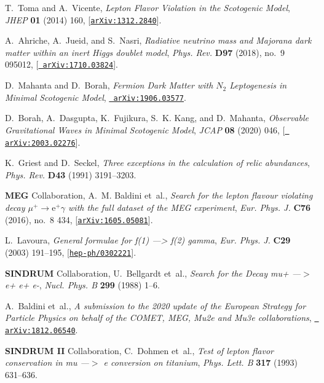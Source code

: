 \documentclass[prd,nofootinbib,preprint,superscriptaddress]{revtex4}
\begin{document}
\begin{thebibliography}{100}
T.~Toma and A.~Vicente, {\it {Lepton Flavor Violation in the Scotogenic
  Model}},  {\em JHEP} {\bf 01} (2014) 160,
  [\href{http://arxiv.org/abs/1312.2840}{{\tt arXiv:1312.2840}}].

A.~Ahriche, A.~Jueid, and S.~Nasri, {\it {Radiative neutrino mass and Majorana
  dark matter within an inert Higgs doublet model}},  {\em Phys. Rev.} {\bf
  D97} (2018), no.~9 095012, [\href{http://arxiv.org/abs/1710.03824}{{\tt
  arXiv:1710.03824}}].

D.~Mahanta and D.~Borah, {\it {Fermion Dark Matter with $N_2$ Leptogenesis in
  Minimal Scotogenic Model}},  \href{http://arxiv.org/abs/1906.03577}{{\tt
  arXiv:1906.03577}}.

D.~Borah, A.~Dasgupta, K.~Fujikura, S.~K. Kang, and D.~Mahanta, {\it
  {Observable Gravitational Waves in Minimal Scotogenic Model}},  {\em JCAP}
  {\bf 08} (2020) 046, [\href{http://arxiv.org/abs/2003.02276}{{\tt
  arXiv:2003.02276}}].

K.~Griest and D.~Seckel, {\it {Three exceptions in the calculation of relic
  abundances}},  {\em Phys. Rev.} {\bf D43} (1991) 3191--3203.

{\bf MEG} Collaboration, A.~M. Baldini et~al., {\it {Search for the lepton
  flavour violating decay $\mu ^+ \rightarrow \mathrm {e}^+ \gamma $ with the
  full dataset of the MEG experiment}},  {\em Eur. Phys. J.} {\bf C76} (2016),
  no.~8 434, [\href{http://arxiv.org/abs/1605.05081}{{\tt arXiv:1605.05081}}].

L.~Lavoura, {\it {General formulae for f(1) ---> f(2) gamma}},  {\em Eur. Phys.
  J.} {\bf C29} (2003) 191--195,
  [\href{http://arxiv.org/abs/hep-ph/0302221}{{\tt hep-ph/0302221}}].

{\bf SINDRUM} Collaboration, U.~Bellgardt et~al., {\it {Search for the Decay
  mu+ ---\ensuremath{>} e+ e+ e-}},  {\em Nucl. Phys. B} {\bf 299} (1988) 1--6.

A.~Baldini et~al., {\it {A submission to the 2020 update of the European
  Strategy for Particle Physics on behalf of the COMET, MEG, Mu2e and Mu3e
  collaborations}},  \href{http://arxiv.org/abs/1812.06540}{{\tt
  arXiv:1812.06540}}.

{\bf SINDRUM II} Collaboration, C.~Dohmen et~al., {\it {Test of lepton flavor
  conservation in mu ---\ensuremath{>} e conversion on titanium}},  {\em Phys.
  Lett. B} {\bf 317} (1993) 631--636.


\end{thebibliography}
\end{document}

